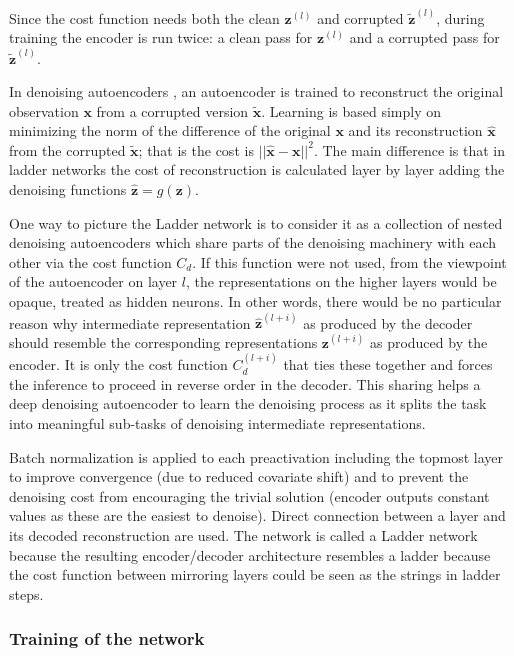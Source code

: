 Since the cost function needs both the clean $\mathbf{z}^{(l)}$ and corrupted
$\mathbf{\tilde{z}}^{(l)}$, during training the encoder is run twice: a clean
pass for $\mathbf{z}^{(l)}$ and a corrupted pass for
$\mathbf{\tilde{z}}^{(l)}$. 

In denoising autoencoders \cite{Vincent:2010:SDA:1756006.1953039}, an
autoencoder is trained to reconstruct the original observation $\mathbf{x}$
from a corrupted version $\mathbf{\tilde{x}}$. Learning is based simply on
minimizing the norm of the difference of the original $\mathbf{x}$ and its
reconstruction $\mathbf{\hat{x}}$ from the corrupted $\mathbf{\tilde{x}}$; that
is the cost is $||\mathbf{\hat{x}} - \mathbf{x}||^{2}$. The main difference is
that in ladder networks the cost of reconstruction is calculated layer by layer
adding the denoising functions $\mathbf{\hat{z}} = g(\mathbf{z})$.

One way to picture the Ladder network is to consider it as a collection of
nested denoising autoencoders which share parts of the denoising machinery with
each other via the cost function $C_{d}$. If this function were not used, from
the viewpoint of the autoencoder on layer $l$, the representations on the
higher layers would be opaque, treated as hidden neurons. In other words, there
would be no particular reason why intermediate representation
$\mathbf{\hat{z}}^{(l+i)}$ as produced by the decoder should resemble the
corresponding representations $\mathbf{z}^{(l+i)}$ as produced by the encoder.
It is only the cost function $C^{(l+i)}_{d}$ that ties these together and
forces the inference to proceed in reverse order in the decoder. This sharing
helps a deep denoising autoencoder to learn the denoising process as it splits
the task into meaningful sub-tasks of denoising intermediate representations.

Batch normalization \cite{Ioffe:2015aa} is applied to each preactivation
including the topmost layer to improve convergence (due to reduced covariate
shift) and to prevent the denoising cost from encouraging the trivial solution
(encoder outputs constant values as these are the easiest to denoise). Direct
connection between a layer and its decoded reconstruction are used. The network
is called a Ladder network because the resulting encoder/decoder architecture
resembles a ladder because the cost function between mirroring layers could be
seen as the strings in ladder steps.

\subsubsection{Training of the network}

